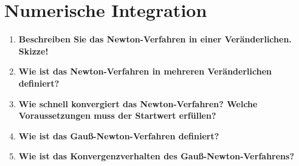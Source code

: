 \section{Numerische Integration}
	\begin{enumerate}
		\item \textbf{Beschreiben Sie das Newton-Verfahren in einer Veränderlichen. Skizze!} \\
		
		\item \textbf{Wie ist das Newton-Verfahren in mehreren Veränderlichen definiert?} \\
		
		\item \textbf{Wie schnell konvergiert das Newton-Verfahren? Welche Voraussetzungen muss der Startwert erfüllen?} \\
		
		\item \textbf{Wie ist das Gauß-Newton-Verfahren definiert?} \\
		
		\item \textbf{Wie ist das Konvergenzverhalten des Gauß-Newton-Verfahrens?} \\
		
	\end{enumerate}
